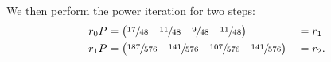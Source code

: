 We then perform the power iteration for two steps:
%
\begin{alignat*}{2}
  r_0 P &=
    \begin{pmatrix}
      \sfrac{17}{48}&\sfrac{11}{48}&\sfrac{9}{48}&\sfrac{11}{48}
    \end{pmatrix} &&= r_1 \\
  r_1 P &=
    \begin{pmatrix}
      \sfrac{187}{576}&\sfrac{141}{576}&\sfrac{107}{576}&\sfrac{141}{576}
    \end{pmatrix} &&= r_2.
\end{alignat*}
